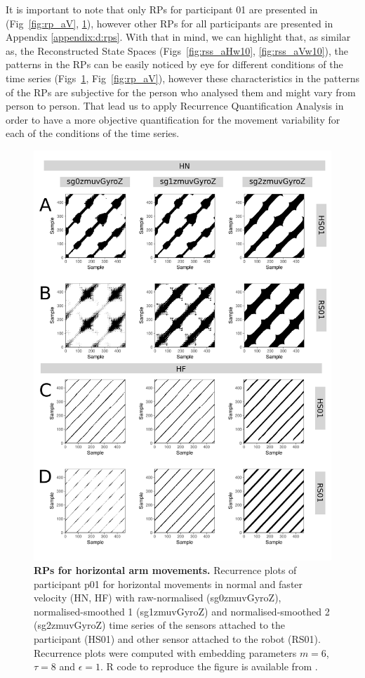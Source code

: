 It is important to note that only RPs for participant 01 are presented
in (Fig~\ref{fig:rp_aV}, \ref{fig:rp_aH}), however
other RPs for all participants are presented in Appendix \ref{appendix:d:rps}.
With that in mind, we can highlight that, as similar as, the 
Reconstructed State Spaces (Figs~\ref{fig:rss_aHw10}, \ref{fig:rss_aVw10}), 
the patterns in the RPs can be easily noticed by eye for different conditions 
of the time series (Figs~\ref{fig:rp_aH}, Fig~\ref{fig:rp_aV}),
however these characteristics in the patterns of the RPs are subjective 
for the person who analysed them and might vary from person to person. 
That lead us to apply Recurrence Quantification Analysis in order to have 
a more objective quantification for the movement variability for each of 
the conditions of the time series.
\begin{figure}[!h]
\centering
\includegraphics[height=0.85\textheight]{rp_aH}
\caption{
	{\bf RPs for horizontal arm movements.}	
	Recurrence plots %
	of participant p01 for horizontal movements in normal and faster 
	velocity (HN, HF) with raw-normalised (sg0zmuvGyroZ), 
	normalised-smoothed 1 (sg1zmuvGyroZ) and 
	normalised-smoothed 2 (sg2zmuvGyroZ) time series of the 
	sensors attached to the participant (HS01) and other sensor 
	attached to the robot (RS01).
	Recurrence plots were computed with 
	embedding parameters $m=6$, $\tau=8$ and $\epsilon=1$.
	R code to reproduce the figure is available from \cite{hwum2018}.
        }
    \label{fig:rp_aH}
\end{figure}
